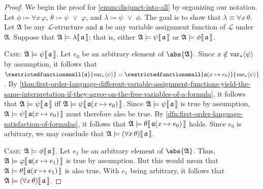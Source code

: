 \begin{proof}
    We begin the proof for \ref{enum:disjunct-into-all} by organizing our notation.
    Let \( \phi \coloneq \forall x \, \varphi \), \( \theta \coloneq \psi \,\,{\lor}\,\, \varphi \), and \( \lambda \coloneq \psi \,\,{\lor}\,\, \phi \).
    The goal is to show that \( \lambda \equiv \forall x \, \theta \).
    Let \( \mathfrak{A} \) be any \( \mathcal{L} \)-structure and \( \mathfrak{a} \) be any variable assignment function of \( \mathcal{L} \) under \( \mathfrak{A} \).
    Suppose that \(  \mathfrak{A} \models \lambda\llbracket\, \mathfrak{a} \,\rrbracket \); that is, either \(  \mathfrak{A} \models \psi\llbracket\, \mathfrak{a} \,\rrbracket \)
    or \(  \mathfrak{A} \models \phi\llbracket\, \mathfrak{a} \,\rrbracket \).

    \vspace{0.3cm}
    \noindent
    {\scshape Case:} \(  \mathfrak{A} \models \psi\llbracket\, \mathfrak{a} \,\rrbracket \).
    Let \( e_{0} \) be an arbitrary element of \( \abs{\mathfrak{A}} \).
    Since \( x \notin \operatorname{var}_{\ast} \langle\psi\rangle \) by assumption, it follows that
    \( \restrictedfunctionsmall{\mathfrak{a}}{\folfreevars{\psi}} = \restrictedfunctionsmall{ \folmodifiedvariableassignmentfunction{\mathfrak{a}}{x}{e_{0}} }{\folfreevars{\psi}} \).
    By \cref{thm:first-order-language-different-variable-assignment-functions-yield-the-same-interpretation-if-they-agree-on-the-free-variables-of-a-formula},
    it follows that \(  \mathfrak{A} \models \psi\llbracket\, \mathfrak{a} \,\rrbracket \) iff
    \( \folwffsatisfaction{\mathfrak{A}}{\psi}{\folmodifiedvariableassignmentfunction{\mathfrak{a}}{x}{e_{0}}} \).
    Since \(  \mathfrak{A} \models \psi\llbracket\, \mathfrak{a} \,\rrbracket \) is true by assumption,
    \( \folwffsatisfaction{\mathfrak{A}}{\psi}{ \folmodifiedvariableassignmentfunction{\mathfrak{a}}{x}{e_{0}} } \) must therefore also be true.
    By \cref{dfn:first-order-language-satisfaction-of-formulas}, it follows that
    \( \folwffsatisfaction{\mathfrak{A}}{\theta}{ \folmodifiedvariableassignmentfunction{\mathfrak{a}}{x}{e_{0}} } \) holds.
    Since \( e_{0} \) is arbitrary, we may conclude that \( \folwffsatisfaction{\mathfrak{A}}{\mleft( \forall x \, \theta \mright)}{\mathfrak{a}} \).

    \vspace{0.3cm}
    \noindent
    {\scshape Case:} \(  \mathfrak{A} \models \phi\llbracket\, \mathfrak{a} \,\rrbracket \).
    Let \( e_{1} \) be an arbitrary element of \( \abs{\mathfrak{A}} \).
    Thus, \( \folwffsatisfaction{\mathfrak{A}}{\varphi}{ \folmodifiedvariableassignmentfunction{\mathfrak{a}}{x}{e_{1}} } \) is true by assumption.
    But this would mean that \( \folwffsatisfaction{\mathfrak{A}}{\theta}{ \folmodifiedvariableassignmentfunction{\mathfrak{a}}{x}{e_{1}} } \) is also true.
    With \( e_{1} \) being arbitrary, it follows that \( \folwffsatisfaction{\mathfrak{A}}{\mleft( \forall x \, \theta \mright)}{\mathfrak{a}} \).


\end{proof}
